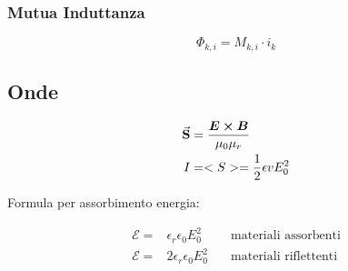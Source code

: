 \documentclass[a4paper]{scrarticle}
\begin{document}
\subsubsection*{Mutua Induttanza} 
\begin{equation}
    \varPhi_{k, i} = M_{k , i} \cdot i_k 
\end{equation}



\subsection{Onde}

\begin{align}
    \va S & = \frac{\bm E \cross \bm B}{\mu_0 \mu_r}\\
    I & = <S> = \frac{1}{2}\epsilon v E^2_0
\end{align}

Formula per assorbimento energia:

\begin{align}
    \mathcal E =&  \epsilon_r \epsilon_0 E_0^2\quad &\text {materiali assorbenti}\\
    \mathcal E =& 2\epsilon_r \epsilon_0 E_0^2\quad &\text {materiali riflettenti}
\end{align}

\pagebreak
\end{document}
